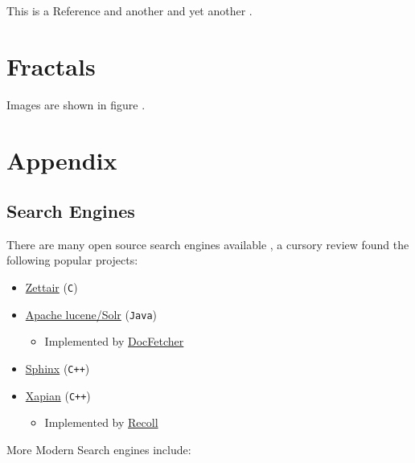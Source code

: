 \documentclass[a4paper,11pt,twoside]{article}
\begin{document}
This is a Reference \cite{tuGraphBasedSemiSupervisedNearestNeighbor2016a} and another \cite{nicodemiIntroductionAbstractAlgebra2007a} and yet another \cite{christopherburgesRankNetLambdaRankLambdaMART2010}.

\section{Fractals}
\label{sec:orgca4052a}
Images are shown in figure .

\section{Appendix}
\label{sec:org8dcf99c}

\subsection{Search Engines}
\label{sec:org5b89c1a}
There are many open source search engines available , a cursory review
found the following popular projects:

\begin{itemize}
\item \href{https://github.com/cyclaero/zettair}{Zettair} (\texttt{C}) \cite{jansenCyclaeroZettair2020}
\item \href{https://github.com/apache/lucene-solr}{Apache lucene/Solr} (\texttt{Java}) \cite{apachesoftwarefoundationLearningRankApache2017}
\begin{itemize}
\item Implemented by \href{https://sourceforge.net/p/docfetcher/code/ci/master/tree/}{DocFetcher} \cite{docfetcherdevelopmentteamDocFetcherFastDocument}
\end{itemize}
\item \href{https://github.com/sphinxsearch/sphinx}{Sphinx} (\texttt{C++}) \cite{yurischapovSphinxsearchSphinx2021}
\item \href{https://github.com/kevinduraj/xapian-search}{Xapian} (\texttt{C++}) \cite{ollybettsXapianXapian2021}
\begin{itemize}
\item Implemented by \href{https://www.lesbonscomptes.com/recoll/}{Recoll} \cite{jean-francoisdockesRecollUserManual}
\end{itemize}
\end{itemize}

More Modern Search engines include:
\end{document}
